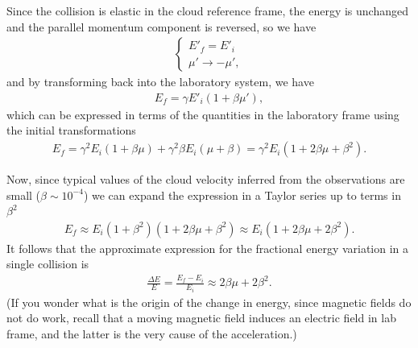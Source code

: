 Since the collision is elastic in the cloud reference frame, the energy is unchanged
and the parallel momentum component is reversed, so we have
\begin{align*}
  \begin{cases}
    E'_f = E'_i\\
    \mu' \rightarrow - \mu',
  \end{cases}
\end{align*}
and by transforming back into the laboratory system, we have
\begin{align*}
  E_f = \gamma E'_i (1 + \beta \mu'),
  \tag{Cloud $\rightarrow$ Lab}
\end{align*}
which can be expressed in terms of the quantities in the laboratory frame using the
initial transformations
\begin{align*}
  E_f = \gamma^2 E_i (1 + \beta \mu) + \gamma^2\beta E_i (\mu + \beta) =
  \gamma^2 E_i (1 + 2 \beta \mu + \beta^2).
\end{align*}

Now, since typical values of the cloud velocity inferred from the observations are
small ($\beta \sim 10^{-4}$) we can expand the expression in a Taylor
series up to terms in $\beta^2$
\begin{align*}
  E_f \approx E_i (1 + \beta^2)(1 + 2 \beta \mu + \beta^2) \approx
  E_i (1 + 2 \beta \mu + 2 \beta^2).
\end{align*}
It follows that the approximate expression for the fractional energy variation in
a single collision is
\begin{align}\label{eq:energy_change}
  \frac{\Delta E}{E} = \frac{E_f - E_i}{E_i} \approx 2 \beta \mu + 2 \beta^2.
\end{align}
(If you wonder what is the origin of the change in energy, since magnetic fields
do not do work, recall that a moving magnetic field induces an electric field in
lab frame, and the latter is the very cause of the acceleration.)

